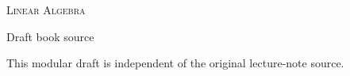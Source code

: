 \begin{titlepage}
\centering
\vspace*{2.0cm}

{\Large\scshape Linear Algebra}\par
\vspace{1.1cm}

{\Huge\bfseries \BookTitle\par}
\vspace{0.5cm}
{\Large\itshape \BookSubtitle\par}

\vfill

{\large \BookAuthor\par}
\vspace{1.5cm}

{\large Draft book source}\par
\vspace{0.25cm}
{\small This modular draft is independent of the original lecture-note source.}

\end{titlepage}

